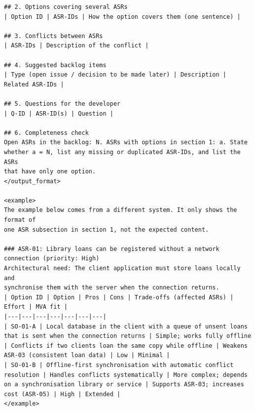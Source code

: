 \begin{lstlisting}
## 2. Options covering several ASRs
| Option ID | ASR-IDs | How the option covers them (one sentence) |

## 3. Conflicts between ASRs
| ASR-IDs | Description of the conflict |

## 4. Suggested backlog items
| Type (open issue / decision to be made later) | Description | Related ASR-IDs |

## 5. Questions for the developer
| Q-ID | ASR-ID(s) | Question |

## 6. Completeness check
Open ASRs in the backlog: N. ASRs with options in section 1: a. State
whether a = N, list any missing or duplicated ASR-IDs, and list the ASRs
that have only one option.
</output_format>

<example>
The example below comes from a different system. It only shows the format of
one ASR subsection in section 1, not the expected content.

### ASR-01: Library loans can be registered without a network connection (priority: High)
Architectural need: The client application must store loans locally and
synchronise them with the server when the connection returns.
| Option ID | Option | Pros | Cons | Trade-offs (affected ASRs) | Effort | MVA fit |
|---|---|---|---|---|---|---|
| SO-01-A | Local database in the client with a queue of unsent loans that is sent when the connection returns | Simple; works fully offline | Conflicts if two clients loan the same copy while offline | Weakens ASR-03 (consistent loan data) | Low | Minimal |
| SO-01-B | Offline-first synchronisation with automatic conflict resolution | Handles conflicts systematically | More complex; depends on a synchronisation library or service | Supports ASR-03; increases cost (ASR-05) | High | Extended |
</example>
\end{lstlisting}
